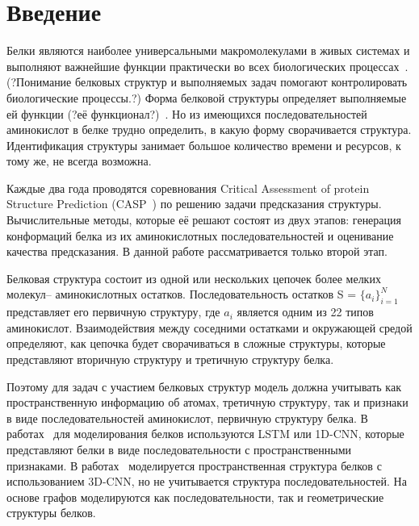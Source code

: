 \documentclass[14pt]{extarticle}
\begin{document}
\newpage


	\section{Введение}
	\label{sec:intro}
	
	Белки являются наиболее универсальными макромолекулами в живых системах и выполняют важнейшие функции практически во всех биологических процессах~\cite{berg2002biochemistry}. (?Понимание белковых структур и выполняемых задач помогают контролировать биологические процессы.?)%
	Форма белковой структуры определяет выполняемые ей функции (?её функционал?)~\cite{berg2002biochemistry}. Но из имеющихся последовательностей аминокислот в белке трудно определить, в какую форму сворачивается структура. Идентификация структуры занимает большое количество времени и ресурсов, к тому же, не всегда возможна. 

Каждые два года проводятся соревнования Critical Assessment of protein Structure Prediction (CASP~\cite{CASP}) по решению задачи предсказания структуры. 	Вычислительные методы, которые её решают состоят из двух этапов: генерация конформаций белка из их аминокислотных последовательностей и оценивание качества предсказания. В данной работе рассматривается только второй этап.

Белковая структура состоит из одной или нескольких цепочек более мелких молекул-- аминокислотных остатков. Последовательность остатков S = $\{a_i\}_{i=1}^N$ представляет его первичную структуру, где $a_i$ является одним из 22 типов аминокислот. Взаимодействия между соседними остатками и окружающей средой определяют, как цепочка будет сворачиваться в сложные структуры, которые представляют вторичную структуру и третичную структуру белка.

Поэтому для задач с участием белковых структур модель должна учитывать как пространственную информацию об атомах, третичную структуру, так и признаки в виде последовательностей аминокислот, первичную структуру белка.  В работах~\cite{HurtadoQA, AngularQA} для моделирования белков используются LSTM или 1D-CNN, которые представляют белки в виде последовательности с пространственными признаками.  В работах~\cite{3DCNN, 10.1093/bioinformatics/btz122} моделируется пространственная структура белков с использованием 3D-CNN, но не учитывается структура последовательностей. На основе графов моделируются как последовательности, так и геометрические структуры белков. 
\end{document}
